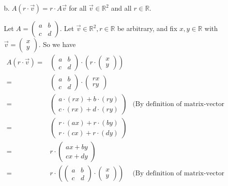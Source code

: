 \documentclass[12pt]{article}
\newenvironment{problem}[2][Problem]
{
	\begin{trivlist} 
		\item[\hskip \labelsep {\bfseries #1 #2:}]
	}
{
	\end{trivlist}
	}
\newenvironment{solution}[1][Solution]
{
	\begin{trivlist} 
		\item[\hskip \labelsep {\itshape #1:}]
	}
	{
	\end{trivlist}
}
\begin{document}
\begin{problem}{6}
\newpage
\noindent
b. $A(r\cdot\vec{v})=r\cdot A\vec{v}$ for all $\vec{v} \in \mathbb{R}^2$ and all $r \in \mathbb{R}$.
\begin{solution}
Let $A=\begin{pmatrix} a&b\\c&d\end{pmatrix}$. Let $\vec{v} \in \mathbb{R}^2,r\in \mathbb{R}$ be arbitrary, and fix $x,y \in \mathbb{R}$ with $\vec{v}=\begin{pmatrix}x\\y\end{pmatrix}$.
So we have
\begin{align*}
A(r\cdot \vec{v}) =& \begin{pmatrix} a&b\\c&d\end{pmatrix} \cdot \left(r\cdot \begin{pmatrix}x\\y\end{pmatrix}\right) &\\
=&\begin{pmatrix} a&b\\c&d\end{pmatrix} \cdot \begin{pmatrix}rx\\ry\end{pmatrix} &\\
=&\begin{pmatrix} a\cdot (rx) + b\cdot (ry) \\c\cdot (rx) +d\cdot (ry)\end{pmatrix} &\text{(By definition of matrix-vector product)} \\
= &\begin{pmatrix} r\cdot (ax) + r\cdot (by) \\r\cdot (cx) +r\cdot (dy)\end{pmatrix} & \\
=& r\cdot \begin{pmatrix} ax +  by \\cx +dy\end{pmatrix} &\\
=& r\cdot \left(\begin{pmatrix} a&b\\c&d\end{pmatrix} \cdot \begin{pmatrix}x\\y\end{pmatrix}\right) & \text{(By definition of matrix-vector product)}\\

\end{align*}
\end{solution}
\end{problem}
\end{document}
